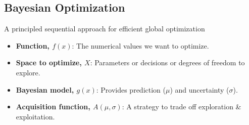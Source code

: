 \subsection{Bayesian Optimization}
\begin{definition}
    A principled sequential approach for efficient global optimization
    \begin{itemize}
        \item \textbf{Function, $f(x)$}: The numerical values we want to optimize.
        \item \textbf{Space to optimize, $X$}: Parameters or decisions or degrees of freedom to explore.
        \item \textbf{Bayesian model, $g(x)$}: Provides prediction ($\mu$) and uncertainty ($\sigma$).
        \item \textbf{Acquisition function, $A(\mu, \sigma)$}: A strategy to trade off exploration \& exploitation.
    \end{itemize}
\end{definition}

